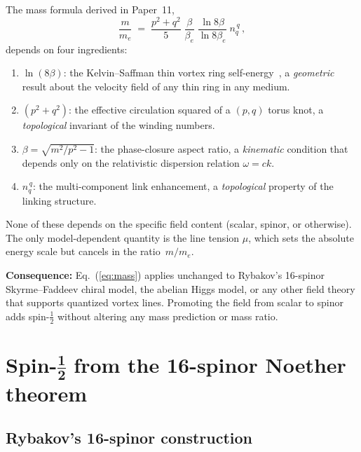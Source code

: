 \documentclass[11pt]{article}
\newcommand{\half}{\tfrac{1}{2}}
\begin{document}
The mass formula derived in Paper~11,
\begin{equation}
\label{eq:mass}
\frac{m}{m_e} \;=\; \frac{p^2+q^2}{5}\;\frac{\beta}{\beta_e}\;
    \frac{\ln 8\beta}{\ln 8\beta_e}\;n_q^{\,q}\,,
\end{equation}
depends on four ingredients:
\begin{enumerate}
\item $\ln(8\beta)$: the Kelvin--Saffman thin vortex ring
      self-energy~\cite{Kelvin1867,Saffman1992}, a \emph{geometric}
      result about the velocity field of any thin ring in any medium.
\item $(p^2+q^2)$: the effective circulation squared of a $(p,q)$
      torus knot, a \emph{topological} invariant of the winding
      numbers.
\item $\beta = \sqrt{m^2/p^2 - 1}$: the phase-closure aspect ratio,
      a \emph{kinematic} condition that depends only on the
      relativistic dispersion relation $\omega = ck$.
\item $n_q^{\,q}$: the multi-component link enhancement, a
      \emph{topological} property of the linking structure.
\end{enumerate}
None of these depends on the specific field content (scalar, spinor,
or otherwise).  The only model-dependent quantity is the line tension
$\mu$, which sets the absolute energy scale but cancels in the
ratio~$m/m_e$.

\textbf{Consequence:}  Eq.~(\ref{eq:mass}) applies unchanged to
Rybakov's 16-spinor Skyrme--Faddeev chiral model, the abelian Higgs
model, or any other field theory that supports quantized vortex lines.
Promoting the field from scalar to spinor adds spin-$\half$ without
altering any mass prediction or mass ratio.


\section{Spin-$\boldsymbol{\half}$ from the 16-spinor Noether theorem}
\label{sec:spin}

\subsection{Rybakov's 16-spinor construction}
\end{document}
